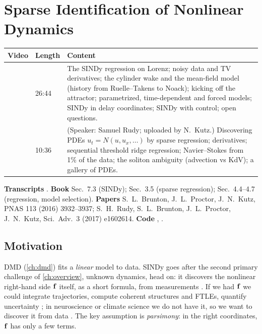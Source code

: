\chapter{Sparse Identification of Nonlinear Dynamics}\label{ch:sindy}
\begin{paracol}{2}

\begin{sources}
\begin{tabularx}{\linewidth}{@{}V l L@{}}
\toprule
\textbf{Video} & \textbf{Length} & \textbf{Content}\\
\midrule
{} & 26:44 & The SINDy regression on Lorenz; noisy data and TV derivatives; the cylinder wake and the mean-field model (history from Ruelle--Takens to Noack); kicking off the attractor; parametrized, time-dependent and forced models; SINDy in delay coordinates; SINDy with control; open questions.\\
 & 10:36 & (Speaker: Samuel Rudy; uploaded by N.~Kutz.) Discovering PDEs $u_t=N(u,u_x,\dots)$ by sparse regression; derivatives; sequential threshold ridge regression; Navier--Stokes from 1\% of the data; the soliton ambiguity (advection vs KdV); a gallery of PDEs.\\
\bottomrule
\end{tabularx}

\smallskip
\textbf{Transcripts} .
\textbf{Book} Sec.~7.3 (SINDy); Sec.~3.5 (sparse regression); Sec.~4.4--4.7 (regression, model selection).
\textbf{Papers} S.~L.~Brunton, J.~L.~Proctor, J.~N.~Kutz, PNAS 113 (2016) 3932--3937; S.~H.~Rudy,
S.~L.~Brunton, J.~L.~Proctor, J.~N.~Kutz, Sci.\ Adv.\ 3 (2017) e1602614.
\textbf{Code} , .
\end{sources}

\section*{Motivation}
DMD (\cref{ch:dmd}) fits a \emph{linear} model to data. SINDy goes after the second primary challenge of
\cref{ch:overview}, unknown dynamics, head on: it discovers the nonlinear right-hand side $\mathbf{f}$ itself,
as a short formula, from measurements . If we had $\mathbf{f}$ we could integrate trajectories,
compute coherent structures and FTLEs, quantify uncertainty ; in neuroscience or
climate science we do not have it, so we want to discover it from data . The key assumption is
\emph{parsimony}: in the right coordinates, $\mathbf{f}$ has only a few terms.


\end{paracol}
